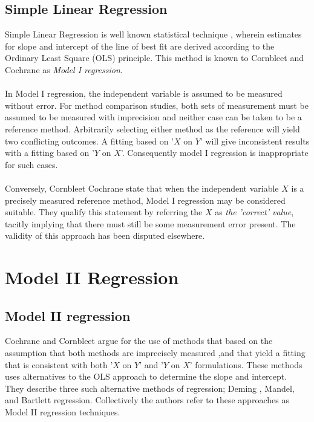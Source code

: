 \documentclass[MAIN.tex]{subfiles}
\begin{document}
\subsection{Simple Linear Regression} Simple Linear Regression is  well
known statistical technique , wherein estimates for slope and intercept of the line of best fit are derived according to the
Ordinary Least Square (OLS) principle. This method is known to Cornbleet and Cochrane as \textit{Model I regression}.
\\
\\
In Model I regression, the independent variable is assumed to be
measured without error. For method comparison studies, both sets of measurement must be assumed to be measured with imprecision and
neither case can be taken to be a reference method. Arbitrarily selecting either method as the reference will yield two
conflicting outcomes. A fitting based on '$X$ on $Y$' will give inconsistent results with a fitting based on '$Y$ on $X$'.
Consequently model I regression is inappropriate for such cases.
\\
\\
Conversely, Cornbleet Cochrane state that when the independent variable $X$ is a precisely measured reference method, Model I
regression may be considered suitable. They qualify this statement
by referring the $X$ as \emph{the 'correct' value}, tacitly implying that there must still be some measurement error present.
The validity of this approach has been disputed elsewhere.

\section{Model II Regression}

\subsection{Model II regression}
Cochrane and Cornbleet argue for the use of methods that based on
the assumption that both methods are imprecisely measured ,and
that yield a fitting that is consistent with both '$X$ on $Y$' and
'$Y$ on $X$' formulations. These methods uses alternatives to the
OLS approach to determine the slope and intercept.
\\
They describe three such alternative methods of regression; Deming
, Mandel, and Bartlett regression. Collectively the authors refer
to these approaches as Model II regression techniques.

\end{document}
